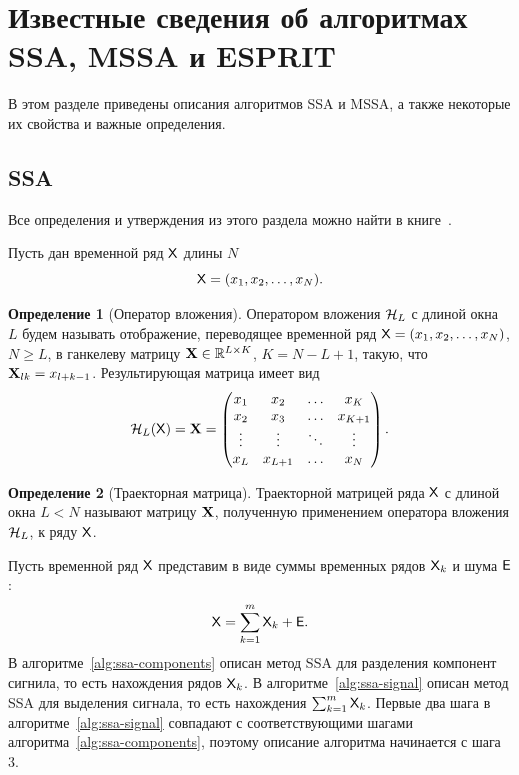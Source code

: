 \documentclass[specialist,
  substylefile=spbu_report.rtx,
subf,href,colorlinks=true, 12pt]{disser}
\theoremstyle{plain}
\theoremstyle{definition}
\newtheorem{definition}{Определение}[section]
\theoremstyle{remark}
\begin{document}
\section{Известные сведения об алгоритмах SSA, MSSA и ESPRIT}\label{sec:known-results-ssa}
В этом разделе приведены описания алгоритмов SSA и MSSA, а также некоторые их свойства и важные определения.

\subsection{SSA}\label{subsec:ssa}
Все определения и утверждения из этого раздела можно найти в книге~\cite{ssa}.

Пусть дан временной ряд $\mathsf{X}$ длины $N$
\[
  \mathsf{X}=(x_1,x_2,\ldots,x_N).
\]

\begin{definition}[Оператор вложения]
  \label{def:injection-op}
  Оператором вложения $\mathcal{H}_L$ с длиной окна $L$ будем называть отображение, переводящее временной ряд
  $\mathsf{X}=(x_1, x_2,\ldots, x_N)$, $N \geqslant L$, в ганкелеву матрицу $\mathbf{X}\in \mathbb{R}^{L \times K}$, $K = N-L+1$,
  такую, что $\mathbf{X}_{lk}=x_{l+k-1}$.
  Результирующая матрица имеет вид
  \[
    \mathcal{H}_L(\mathsf{X}) = \mathbf{X} =
    \begin{pmatrix}
      x_1    & x_2     & \ldots & x_K     \\
      x_2    & x_3     & \ldots & x_{K+1} \\
      \vdots & \vdots  & \ddots & \vdots  \\
      x_L    & x_{L+1} & \ldots & x_N
    \end{pmatrix}.
  \]
\end{definition}

\begin{definition}[Траекторная матрица]
  Траекторной матрицей ряда $\mathsf{X}$ с длиной окна $L<N$ называют матрицу $\mathbf{X}$, полученную применением оператора
  вложения $\mathcal{H}_L$, к ряду $\mathsf{X}$.
\end{definition}

Пусть временной ряд $\mathsf{X}$ представим в виде суммы временных рядов $\mathsf{X}_k$ и шума $\mathsf{E}$:
\[
  \mathsf{X} = \sum_{k=1}^{m} \mathsf{X}_k + \mathsf{E}.
\]
В алгоритме~\ref{alg:ssa-components} описан метод SSA для разделения компонент сигнила, то есть
нахождения рядов $\mathsf{X}_k$.
В алгоритме~\ref{alg:ssa-signal} описан метод SSA для выделения сигнала, то есть нахождения $\sum_{k=1}^{m} \mathsf{X}_k$.
Первые два шага в алгоритме~\ref{alg:ssa-signal} совпадают с соответствующими шагами
алгоритма~\ref{alg:ssa-components}, поэтому описание алгоритма начинается с шага 3.
\end{document}
